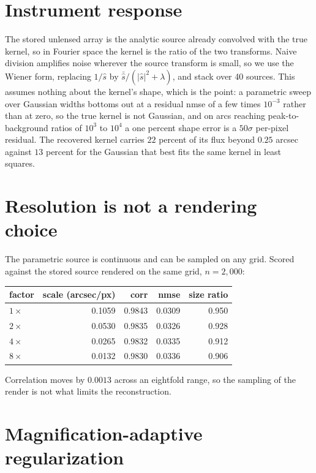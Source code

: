 \documentclass{article}
\begin{document}
\section{Instrument response}
\label{app:psf}

The stored unlensed array is the analytic source already convolved with the true
kernel, so in Fourier space the kernel is the ratio of the two transforms. Naive
division amplifies noise wherever the source transform is small, so we use the
Wiener form, replacing $1/\hat{s}$ by
$\bar{\hat{s}}/(|\hat{s}|^{2} + \lambda)$, and stack over 40 sources. This
assumes nothing about the kernel's shape, which is the point: a parametric sweep
over Gaussian widths bottoms out at a residual nmse of a few times $10^{-3}$
rather than at zero, so the true kernel is not Gaussian, and on arcs reaching
peak-to-background ratios of $10^{3}$ to $10^{4}$ a one percent shape error is a
$50\sigma$ per-pixel residual. The recovered kernel carries $22$ percent of its
flux beyond $0.25$ arcsec against $13$ percent for the Gaussian that best fits
the same kernel in least squares.

\section{Resolution is not a rendering choice}
\label{app:resolution}

The parametric source is continuous and can be sampled on any grid. Scored
against the stored source rendered on the same grid, $n = 2{,}000$:

\begin{table}[h]
  \centering
  \small
  \begin{tabular}{lrrrr}
    \toprule
    factor & scale (arcsec/px) & corr & nmse & size ratio \\
    \midrule
    $1\times$ & 0.1059 & 0.9843 & 0.0309 & 0.950 \\
    $2\times$ & 0.0530 & 0.9835 & 0.0326 & 0.928 \\
    $4\times$ & 0.0265 & 0.9832 & 0.0335 & 0.912 \\
    $8\times$ & 0.0132 & 0.9830 & 0.0336 & 0.906 \\
    \bottomrule
  \end{tabular}
\end{table}

Correlation moves by $0.0013$ across an eightfold range, so the sampling of the
render is not what limits the reconstruction.

\section{Magnification-adaptive regularization}
\label{app:gate}
\end{document}

